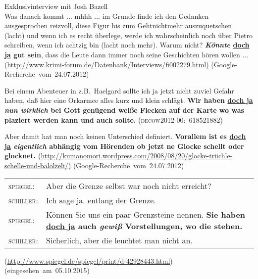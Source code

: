 \begin{exe}
	\ex\label{478} 
	Exklusivinterview mit Josh Bazell\\
	Was danach kommt ... mhhh ... im Grunde finde ich den Gedanken ausgesprochen reizvoll, diese Figur bis zum Gehtnichtmehr auszuquetschen (lacht) und 		wenn ich es recht überlege, werde ich wahrscheinlich noch über Pietro schreiben, wenn ich achtzig bin (lacht noch mehr). Warum nicht? \textbf{\textit{Könnte} \underline{doch ja} gut sein}, dass die Leute dann immer noch seine Geschichten hören wollen ...			
	\newline		
	{\scriptsize(\url{http://www.krimi-forum.de/Datenbank/Interviews/fi002279.html})	}
	\newline		
	\hbox{}\hfill\hbox{(Google-Recherche vom 24.07.2012)}	
\end{exe} 

\begin{exe}
	\ex\label{479} 

	Bei einem Abenteuer in z.B.\ Haelgard sollte ich ja jetzt nicht zuviel Gefahr haben, daß hier eine Orkarmee alles kurz und klein schlägt. \textbf{Wir 		haben \underline{doch ja} \textit{nun wirklich} bei Gott genügend weiße Flecken auf der Karte wo was plaziert werden kann und auch sollte.} 		
	\newline\hbox{}\hfill\hbox{\scshape(decow2012-00: 618521882)}	
	\newline		
	\hbox{}\hfill\hbox{\citet[228]{Mueller2017b}}	
\end{exe} 		      
\largerpage
\begin{exe}
	\ex\label{480} 

	Aber damit hat man noch keinen Unterschied definiert. \textbf{Vorallem ist es \underline{doch ja} \textit{eigentlich} abhängig vom Hörenden ob jetzt ne Glocke schellt oder glocknet.}
	\newline
	{\scriptsize(\url{http://kumanomori.wordpress.com/2008/08/20/glocke-triichle-schelle-und-balolzeli/})}
	\newline		
	\hbox{}\hfill\hbox{(Google-Recherche vom 24.07.2012)}	
	\newline		
	\hbox{}\hfill\hbox{\citet[201]{Mueller2014a}}	
\end{exe} 	

\begin{exe}
\ex\label{481}
     \begin{tabularx}{\linewidth}[t]{@{}lX@{}}
	\scshape spiegel: & Aber die Grenze selbst war noch nicht erreicht?\\
	\scshape schiller: & Ich sage ja. entlang der Grenze. \\ 
	\scshape spiegel: & Können Sie uns ein paar Grenzsteine nennen. \textbf{Sie haben \underline{doch ja} auch \textit{gewiß} Vorstellungen, wo die stehen.} \\
	\scshape schiller: & Sicherlich, aber die leuchtet man nicht an.\\ 
\end{tabularx}
	\newline		
	{\scriptsize(\url{http://www.spiegel.de/spiegel/print/d-42928443.html})}
	\newline		
	\hbox{}\hfill\hbox{(eingesehen am 05.10.2015)}
\end{exe}

